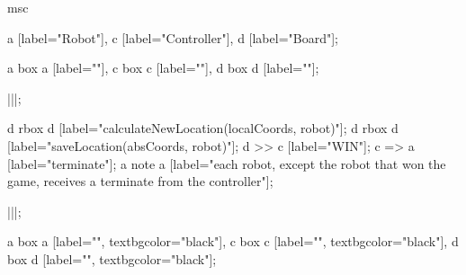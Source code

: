 \begin{msc}
msc
{

a [label="Robot"],
c [label="Controller"],
d [label="Board"];

a box a [label=""],
c box c [label=""],
d box d [label=""];

|||;

d rbox d [label="calculateNewLocation(localCoords, robot)"];
d rbox d [label="saveLocation(absCoords, robot)"];
d >> c [label="WIN"];
c => a [label="terminate"];
a note a [label="each robot, except the robot that won the game, receives a terminate from the controller"];

|||;

a box a [label="", textbgcolor="black"],
c box c [label="", textbgcolor="black"],
d box d [label="", textbgcolor="black"];

}
\end{msc}
